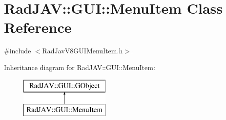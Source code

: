\hypertarget{class_rad_j_a_v_1_1_g_u_i_1_1_menu_item}{}\section{Rad\+J\+AV\+:\+:G\+UI\+:\+:Menu\+Item Class Reference}
\label{class_rad_j_a_v_1_1_g_u_i_1_1_menu_item}


{\ttfamily \#include $<$Rad\+Jav\+V8\+G\+U\+I\+Menu\+Item.\+h$>$}

Inheritance diagram for Rad\+J\+AV\+:\+:G\+UI\+:\+:Menu\+Item\+:\begin{figure}[H]
\begin{center}
\leavevmode
\includegraphics[height=2.000000cm]{class_rad_j_a_v_1_1_g_u_i_1_1_menu_item}
\end{center}
\end{figure}
